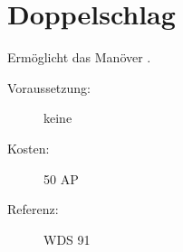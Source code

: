 \section{Doppelschlag}
\label{sf.doppelschlag}
Ermöglicht das Manöver .
\begin{description}
    \item[Voraussetzung:]
        keine
    \item [Kosten:]
        50 AP
    \item [Referenz:]
        WDS 91
\end{description}
